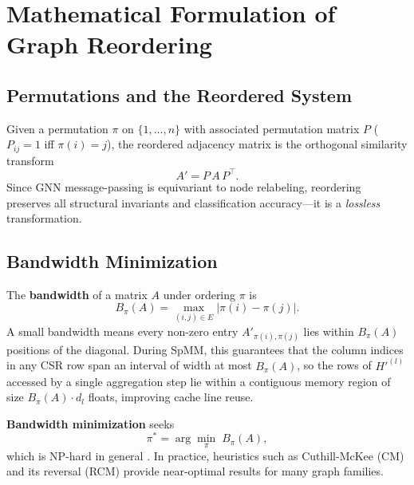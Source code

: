 \documentclass[sigconf,review]{acmart}
\begin{document}
\section{Mathematical Formulation of Graph Reordering}
\label{sec:math}

\subsection{Permutations and the Reordered System}

Given a permutation $\pi$ on $\{1,\dots,n\}$ with associated permutation matrix $P$ ($P_{ij}=1$ iff $\pi(i)=j$), the reordered adjacency matrix is the orthogonal similarity transform
\begin{equation}\label{eq:perm}
    A' = P\, A\, P^\top.
\end{equation}
Since GNN message-passing is equivariant to node relabeling, reordering preserves all structural invariants and classification accuracy---it is a \emph{lossless} transformation.

\subsection{Bandwidth Minimization}
\label{sec:bandwidth}

The \textbf{bandwidth} of a matrix $A$ under ordering $\pi$ is
\begin{equation}\label{eq:bw}
    B_\pi(A) = \max_{(i,j)\in E} \bigl|\pi(i) - \pi(j)\bigr|.
\end{equation}
A small bandwidth means every non-zero entry $A'_{\pi(i),\pi(j)}$ lies within $B_\pi(A)$ positions of the diagonal. During SpMM, this guarantees that the column indices in any CSR row span an interval of width at most $B_\pi(A)$, so the rows of $H'^{(l)}$ accessed by a single aggregation step lie within a contiguous memory region of size $B_\pi(A) \cdot d_l$ floats, improving cache line reuse.

\textbf{Bandwidth minimization} seeks
\begin{equation}\label{eq:bwmin}
    \pi^* = \arg\min_\pi\; B_\pi(A),
\end{equation}
which is NP-hard in general \cite{papadimitriou1976nphard}. In practice, heuristics such as Cuthill-McKee (CM) and its reversal (RCM) \cite{cuthill1969bandwidth} provide near-optimal results for many graph families.
\end{document}
